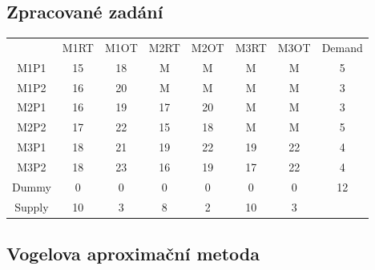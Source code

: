 \documentclass{article}%
\begin{document}
\subsection{Zpracované zadání}
\begin{tabular}{cccccccc}
    & M1RT & M1OT & M2RT & M2OT & M3RT & M3OT & Demand \\
M1P1   & 15   & 18   & M    & M    & M    & M    & 5      \\
M1P2   & 16   & 20   & M    & M    & M    & M    & 3      \\
M2P1   & 16   & 19   & 17   & 20   & M    & M    & 3      \\
M2P2   & 17   & 22   & 15   & 18   & M    & M    & 5      \\
M3P1   & 18   & 21   & 19   & 22   & 19   & 22   & 4      \\
M3P2   & 18   & 23   & 16   & 19   & 17   & 22   & 4      \\
Dummy  & 0    & 0    & 0    & 0    & 0    & 0    & 12     \\
Supply & 10   & 3    & 8    & 2    & 10   & 3    &       
\end{tabular}

\newpage
\subsection{Vogelova aproximační metoda}
\end{document}
